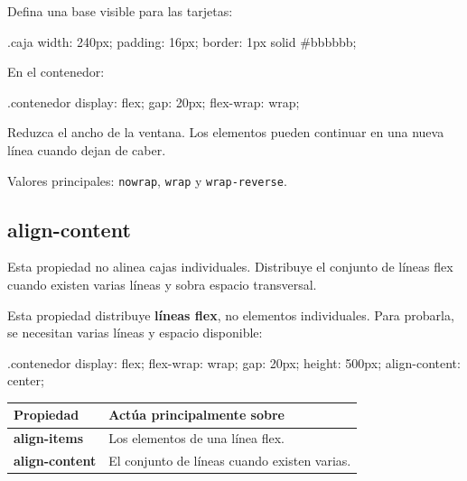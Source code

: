 \documentclass[11pt]{article}
\begin{document}
    Defina una base visible para las tarjetas:

    \begin{csscodedark}
        .caja {
            width: 240px;
            padding: 16px;
            border: 1px solid #bbbbbb;
        }
    \end{csscodedark}

    En el contenedor:

    \begin{csscodedark}
        .contenedor {
            display: flex;
            gap: 20px;
            flex-wrap: wrap;
        }
    \end{csscodedark}

    Reduzca el ancho de la ventana. Los elementos pueden continuar en una nueva línea cuando dejan de caber.

    Valores principales: \texttt{nowrap}, \texttt{wrap} y \texttt{wrap-reverse}.

    \subsection{align-content}

    Esta propiedad no alinea cajas individuales. Distribuye el conjunto de líneas flex cuando existen varias líneas y sobra espacio transversal.

    Esta propiedad distribuye \textbf{líneas flex}, no elementos individuales. Para probarla, se necesitan varias líneas y espacio disponible:

    \begin{csscodedark}
        .contenedor {
            display: flex;
            flex-wrap: wrap;
            gap: 20px;
            height: 500px;
            align-content: center;
        }
    \end{csscodedark}

    \begin{center}
        \begin{tabularx}{0.9\textwidth}{>{\bfseries}p{3.3cm}X}
            \toprule
            Propiedad & Actúa principalmente sobre \\
            \midrule
            align-items & Los elementos de una línea flex. \\
            align-content & El conjunto de líneas cuando existen varias. \\
            \bottomrule
        \end{tabularx}
    \end{center}
\end{document}
